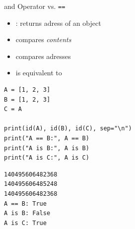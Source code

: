 \begin{frame}[fragile]{ and Operator  vs. \texttt{==}}
%
\begin{itemize}
\item {}: returns adress of an object
\item \inPy{==} compares \emph{contents}
\item {} compares adresses
\item {} is equivalent to 
\end{itemize}
%
\begin{tcbraster}[raster columns=2,
                  raster equal height,
                  nobeforeafter,
                  raster column skip=0.5cm]
\begin{codebox}[Example: \texttt{is} vs. \texttt{==}]
\begin{verbatim}
A = [1, 2, 3]
B = [1, 2, 3]
C = A

print(id(A), id(B), id(C), sep="\n")
print("A == B:", A == B)
print("A is B:", A is B)
print("A is C:", A is C)
\end{verbatim}
\end{codebox}
%
\begin{cmdbox}[Output: \texttt{is} vs. \texttt{==}]
\begin{verbatim}
140495606482368
140495606485248
140495606482368
A == B: True
A is B: False
A is C: True
\end{verbatim}
\end{cmdbox}
\end{tcbraster}
%
\end{frame}


